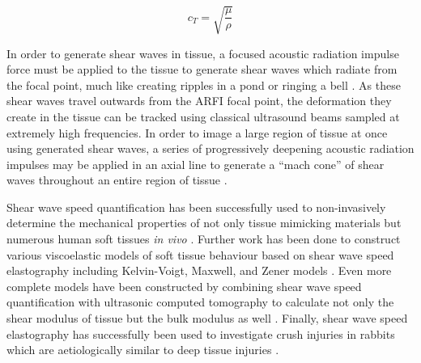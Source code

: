 			\begin{equation}
			\label{equ:litreview_shear_speed}
				c_T = \sqrt{\frac{\mu}{\rho}}
			\end{equation}

			In order to generate shear waves in tissue, a focused acoustic radiation impulse force must be applied to the tissue to generate shear waves which radiate from the focal point, much like creating ripples in a pond or ringing a bell \cite{nightingale03}. As these shear waves travel outwards from the ARFI focal point, the deformation they create in the tissue can be tracked using classical ultrasound beams sampled at extremely high frequencies. In order to image a large region of tissue at once using generated shear waves, a series of progressively deepening acoustic radiation impulses may be applied in an axial line to generate a ``mach cone'' of shear waves throughout an entire region of tissue \cite{bercoff04}.

			Shear wave speed quantification has been successfully used to non-invasively determine the mechanical properties of not only tissue mimicking materials \cite{cao13} but numerous human soft tissues \emph{in vivo} \cite{arda11}. Further work has been done to construct various viscoelastic models of soft tissue behaviour based on shear wave speed elastography including Kelvin-Voigt, Maxwell, and Zener models \cite{chen12,amador12}. Even more complete models have been constructed by combining shear wave speed quantification with ultrasonic computed tomography to calculate not only the shear modulus of tissue but the bulk modulus as well \cite{glozman10}. Finally, shear wave speed elastography has successfully been used to investigate crush injuries in rabbits which are aetiologically similar to deep tissue injuries \cite{lv21}.


